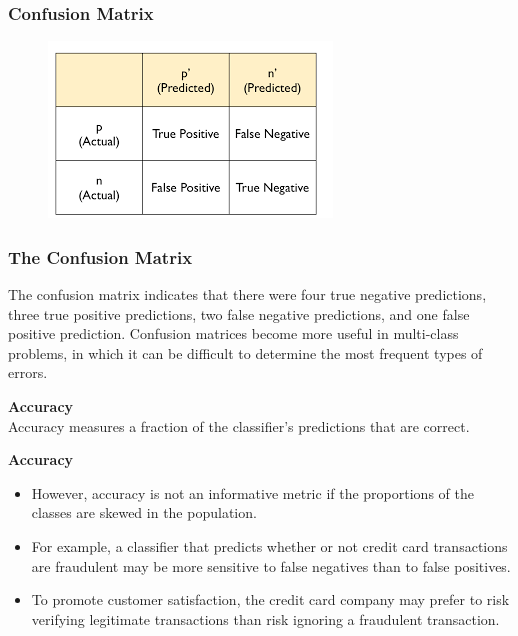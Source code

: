 \documentclass[PredictiveAnalytics101.tex]{subfiles}
\begin{document}
 

\begin{frame}
\frametitle{Confusion Matrix}

\end{frame}


\begin{frame}
	\begin{figure}
\centering
\includegraphics[width=0.7\linewidth]{confusionmatrix2}
\caption{}
\label{fig:confusionmatrix2}
\end{figure}

\end{frame}
\begin{frame}
\frametitle{The Confusion Matrix}
The confusion matrix indicates that there were four true negative predictions, three
true positive predictions, two false negative predictions, and one false positive
prediction. Confusion matrices become more useful in multi-class problems, in
which it can be difficult to determine the most frequent types of errors.
\end{frame}
\begin{frame}
\textbf{Accuracy}\\
Accuracy measures a fraction of the classifier's predictions that are correct.
\end{frame}
\begin{frame}
	\textbf{Accuracy}\\
\begin{itemize}
\item However, accuracy is not an informative metric if the proportions of
the classes are skewed in the population. 
\item For example, a classifier that predicts
whether or not credit card transactions are fraudulent may be more sensitive to
false negatives than to false positives. 
\item To promote customer satisfaction, the credit
card company may prefer to risk verifying legitimate transactions than risk ignoring
a fraudulent transaction. 
\end{itemize}

\end{frame}
\end{document}
